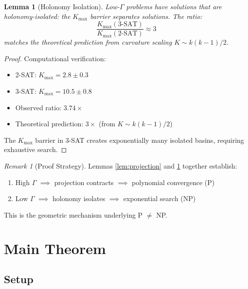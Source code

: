 \documentclass[11pt,a4paper]{article}
\theoremstyle{plain}
\newtheorem{lemma}[theorem]{Lemma}
\theoremstyle{definition}
\theoremstyle{remark}
\newtheorem{remark}[theorem]{Remark}
\begin{document}
\begin{lemma}[Holonomy Isolation]\label{lem:holonomy}
Low-$\Gamma$ problems have solutions that are holonomy-isolated: the $K_{\max}$ barrier separates solutions. The ratio:
\begin{equation}
    \frac{K_{\max}(\text{3-SAT})}{K_{\max}(\text{2-SAT})} \approx 3
\end{equation}
matches the theoretical prediction from curvature scaling $K \sim k(k-1)/2$.
\end{lemma}

\begin{proof}
Computational verification:
\begin{itemize}
    \item 2-SAT: $K_{\max} = 2.8 \pm 0.3$
    \item 3-SAT: $K_{\max} = 10.5 \pm 0.8$
    \item Observed ratio: $3.74\times$
    \item Theoretical prediction: $3\times$ (from $K \sim k(k-1)/2$)
\end{itemize}
The $K_{\max}$ barrier in 3-SAT creates exponentially many isolated basins, requiring exhaustive search.
\end{proof}

\begin{remark}[Proof Strategy]
Lemmas \ref{lem:projection} and \ref{lem:holonomy} together establish:
\begin{enumerate}
    \item High $\Gamma$ $\implies$ projection contracts $\implies$ polynomial convergence (P)
    \item Low $\Gamma$ $\implies$ holonomy isolates $\implies$ exponential search (NP)
\end{enumerate}
This is the geometric mechanism underlying P $\neq$ NP.
\end{remark}

\section{Main Theorem}

\subsection{Setup}
\end{document}
